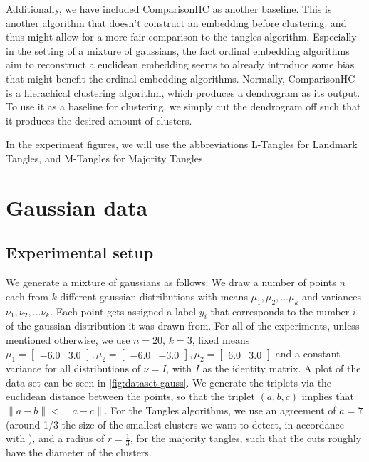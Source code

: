 Additionally, we have included ComparisonHC \citep{ghoshdastidarFoundationsComparisonBasedHierarchical2019} as another baseline. This is another algorithm that doesn't
construct an embedding before clustering, and thus might allow for a more fair comparison to the tangles algorithm. Especially in the setting of a mixture of gaussians, 
the fact ordinal embedding algorithms aim to reconstruct a euclidean embedding seems to already introduce some bias that might benefit the ordinal embedding algorithms.
Normally, ComparisonHC is a hierachical clustering algorithm, which produces a dendrogram as its output. To use it as a baseline for clustering, we simply
cut the dendrogram off such that it produces the desired amount of clusters.

In the experiment figures, we will  use the abbreviations L-Tangles for Landmark Tangles, and M-Tangles for Majority Tangles.

\section{Gaussian data}\label{sec:gaussian_data}
\subsection{Experimental setup}
We generate a mixture of gaussians as follows: We draw a number of points $n$ each from $k$ different gaussian distributions with means $\mu_1, \mu_2, \ldots \mu_k$ and 
variances $\nu_1, \nu_2, \ldots \nu_k$. Each point gets assigned a label $y_i$ that corresponds to the number $i$ of the gaussian distribution it was drawn from.
For all of the experiments, unless mentioned otherwise, we use $n=20$, $k=3$, fixed means $\mu_1 = \begin{bmatrix} -6.0 & 3.0 \end{bmatrix}, 
\mu_2 = \begin{bmatrix} -6.0 & -3.0 \end{bmatrix},  \mu_2 = \begin{bmatrix} 6.0 & 3.0 \end{bmatrix}$ and a constant variance for all distributions of $\nu = I$, 
with $I$ as the identity matrix. A plot of the data set can be seen in \autoref{fig:dataset-gauss}. We generate the triplets via the euclidean distance between the points, so that
the triplet $(a,b,c)$ implies that $\|a - b\| < \|a - c\|$. For the Tangles algorithms, we use an agreement of $a=7$ (around 1/3 the size of the smallest
clusters we want to detect, in accordance with \cite{klepperClusteringTanglesAlgorithmic2021}), and a radius of $r=\frac{1}{3}$, for the majority
tangles, such that the cuts roughly have the diameter of the clusters.

